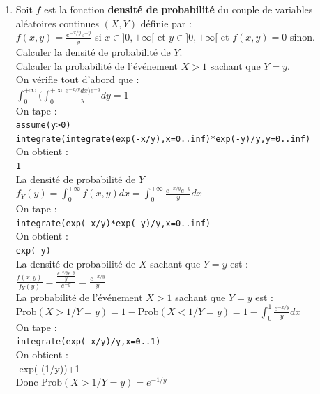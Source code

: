 \documentclass[a4paper,11pt]{book}
\begin{document}
\begin{enumerate}
{\tt 1}\\
On a :\\
$f_Y(y)=\int_0^{+\infty} e^{-(x+y)}dx$\\
On tape :\\
{\tt int(exp(-(x+y)),x=0..inf)}\\
On obtient :\\
{\tt exp(-y)}\\
On a si $D$ est la portion de plan $\{x>0,y>x\}$:\\
$P(X<Y)=\int\int_D e^{-(x+y)}dx)dy$\\
On tape :\\
{\tt int(int(exp(-(x+y)),y=x..inf),x=0..inf)}\\
On obtient :\\
{\tt 1/2}\\
\item Soit  $f$ est la fonction {\bf densit\'e de probabilit\'e} du couple de 
variables al\'eatoires continues $(X,Y)$ d\'efinie par :\\
$\displaystyle f(x,y)=\frac{e^{-x/y}e^{-y}}{y}$ si $x\in ]0,+\infty[$ et $y\in ]0,+\infty[$ et $f(x,y)=0$ sinon.\\
Calculer la densit\'e de probabilit\'e de $Y$.\\
Calculer la probabilit\'e de l'\'ev\'enement $X>1$ sachant que $Y=y$.\\

On v\'erifie tout d'abord que :\\
$\int_0^{+\infty}(\int_0^{+\infty} \frac{e^{-x/y}dx)e^{-y}}{y}dy=1$\\
On tape :\\
{\tt assume(y>0)}\\
{\tt integrate(integrate(exp(-x/y),x=0..inf)*exp(-y)/y,y=0..inf)}\\
On obtient :\\
{\tt 1}\\
La densit\'e de probabilit\'e de $Y$\\
$f_Y(y)=\int_0^{+\infty}f(x,y)dx=\int_0^{+\infty}\frac{e^{-x/y}e^{-y}}{y}dx$\\
On tape :\\
{\tt integrate(exp(-x/y)*exp(-y)/y,x=0..inf)}\\
On obtient :\\
{\tt exp(-y)}\\
La densit\'e de probabilit\'e de $X$ sachant que $Y=y$ est :\\
$\displaystyle \frac{f(x,y)}{f_Y(y)}=\frac{\frac{e^{-x/y}e^{-y}}{y}}{e^{-y}}=\frac{e^{-x/y}}{y}$\\
La probabilit\'e de l'\'ev\'enement $X>1$ sachant que $Y=y$ est :\\
$\mbox{Prob}(X>1/Y=y)=1-\mbox{Prob}(X<1/Y=y)=1-\int_0^1\frac{e^{-x/y}}{y}dx$\\
On tape :\\
{\tt integrate(exp(-x/y)/y,x=0..1)}\\
On obtient :\\
{-exp(-(1/y))+1} \\
Donc $\mbox{Prob}(X>1/Y=y)=e^{-1/y}$


\end{enumerate}
\end{document}
